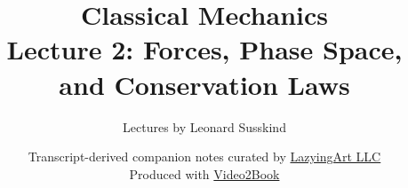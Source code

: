 \documentclass[11pt,oneside]{book}
\begin{document}
\hypersetup{pageanchor=false}
\frontmatter
\title{Classical Mechanics\\[0.45em]
\large Lecture 2: Forces, Phase Space, and Conservation Laws}
\author{Lectures by Leonard Susskind}
\date{Transcript-derived companion notes curated by
\href{https://lazying.art}{LazyingArt LLC}\\[0.35em]
\small Produced with
\href{https://github.com/lachlanchen/Video2Book}{Video2Book}}
\maketitle
\hypersetup{pageanchor=true}
\mainmatter

\end{document}
